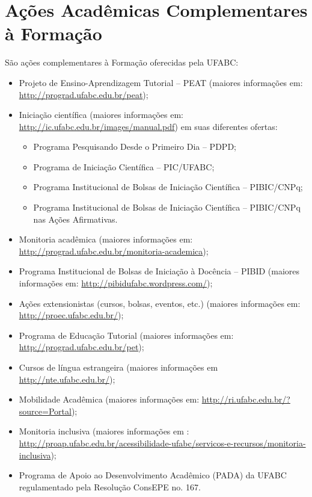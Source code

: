 \section {Ações Acadêmicas Complementares à Formação}

São ações complementares à Formação oferecidas pela UFABC:
\begin{itemize}
	\item Projeto de Ensino-Aprendizagem Tutorial – PEAT (maiores informações em: \url{http://prograd.ufabc.edu.br/peat});
	\item Iniciação científica (maiores informações em: \url{http://ic.ufabc.edu.br/images/manual.pdf}) em suas diferentes ofertas: 
	\begin{itemize}
		\item Programa Pesquisando Desde o Primeiro Dia – PDPD;
		\item Programa de Iniciação Científica – PIC/UFABC;
		\item Programa Institucional de Bolsas de Iniciação Científica – PIBIC/CNPq;
		\item Programa Institucional de Bolsas de Iniciação Científica – PIBIC/CNPq nas Ações Afirmativas.
		
	\end{itemize}
	\item Monitoria acadêmica (maiores informações em: \url{http://prograd.ufabc.edu.br/monitoria-academica});
	\item Programa Institucional de Bolsas de Iniciação à Docência – PIBID (maiores informações em: \url{http://pibidufabc.wordpress.com/});
	\item Ações extensionistas (cursos, bolsas, eventos, etc.) (maiores informações em: \url{http://proec.ufabc.edu.br/});
	\item Programa de Educação Tutorial (maiores informações em: \url{http://prograd.ufabc.edu.br/pet});
	\item Cursos de língua estrangeira (maiores informações em \url{http://nte.ufabc.edu.br/});
	\item Mobilidade Acadêmica (maiores informações em: \url{http://ri.ufabc.edu.br/?source=Portal});
	\item Monitoria inclusiva (maiores informações em : \url{http://proap.ufabc.edu.br/acessibilidade-ufabc/servicos-e-recursos/monitoria-inclusiva});
	\item Programa de Apoio ao Desenvolvimento Acadêmico (PADA) da UFABC regulamentado pela Resolução ConsEPE no. 167.
	
\end{itemize}
